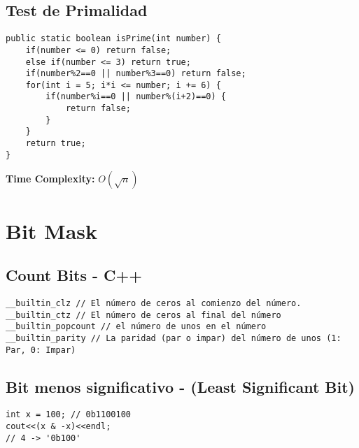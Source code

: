 \documentclass[10pt,letterpaper,twocolumn,twosided]{article}
\begin{document}
\subsection{Test de Primalidad}
\begin{lstlisting}
public static boolean isPrime(int number) {
    if(number <= 0) return false;
    else if(number <= 3) return true;
    if(number%2==0 || number%3==0) return false;
    for(int i = 5; i*i <= number; i += 6) {
        if(number%i==0 || number%(i+2)==0) {
            return false;
        }
    }
    return true;
}
\end{lstlisting}
\textbf{Time Complexity:}
$O\left(\sqrt{n}\right)$



\section{Bit Mask}

\subsection{Count Bits - C++}
\begin{lstlisting}
__builtin_clz // El número de ceros al comienzo del número.
__builtin_ctz // El número de ceros al final del número
__builtin_popcount // el número de unos en el número
__builtin_parity // La paridad (par o impar) del número de unos (1: Par, 0: Impar)
\end{lstlisting}

\subsection{Bit menos significativo - (Least Significant Bit)}
\begin{lstlisting}
int x = 100; // 0b1100100
cout<<(x & -x)<<endl;
// 4 -> '0b100'
\end{lstlisting}

\end{document}
